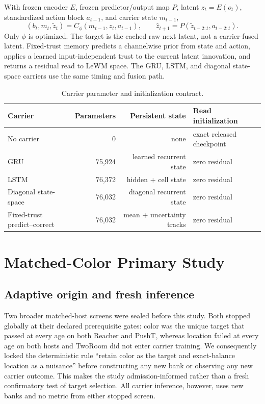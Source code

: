 With frozen encoder $E$, frozen predictor/output map $P$, latent $z_t=E(o_t)$, standardized action block $a_{t-1}$, and carrier state $m_{t-1}$,
\begin{equation}
  (b_t,m_t,\widetilde z_t)=C_\phi(m_{t-1},z_t,a_{t-1}),
  \qquad
  \widehat z_{t+1}=P(\widetilde z_{t-2:t},a_{t-2:t}).
\end{equation}
Only $\phi$ is optimized. The target is the cached raw next latent, not a carrier-fused latent. Fixed-trust memory predicts a channelwise prior from state and action, applies a learned input-independent trust to the current latent innovation, and returns a residual read to LeWM space. The GRU, LSTM, and diagonal state-space carriers use the same timing and fusion path.

\begin{table}[H]
\centering
\scriptsize
\setlength{\tabcolsep}{5pt}
\caption{Carrier parameter and initialization contract.}
\begin{tabular}{lrrl}
\toprule
Carrier & Parameters & Persistent state & Read initialization \\
\midrule
No carrier & 0 & none & exact released checkpoint \\
GRU & 75,924 & learned recurrent state & zero residual \\
LSTM & 76,372 & hidden + cell state & zero residual \\
Diagonal state-space & 76,032 & diagonal recurrent state & zero residual \\
Fixed-trust predict--correct & 76,032 & mean + uncertainty tracks & zero residual \\
\bottomrule
\end{tabular}
\end{table}



\section{Matched-Color Primary Study}
\label{app:matched-primary}

\subsection{Adaptive origin and fresh inference}

Two broader matched-host screens were sealed before this study.  Both stopped
globally at their declared prerequisite gates: color was the unique target that
passed at every age on both Reacher and PushT, whereas location failed at every
age on both hosts and TwoRoom did not enter carrier training.  We consequently
locked the deterministic rule ``retain color as the target and exact-balance
location as a nuisance'' before constructing any new bank or observing any new
carrier outcome.  This makes the study admission-informed rather than a fresh
confirmatory test of target selection.  All carrier inference, however, uses
new banks and no metric from either stopped screen.


